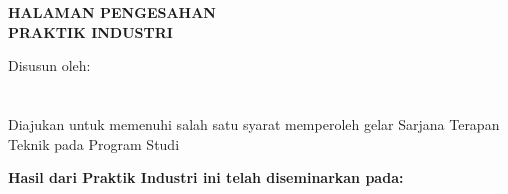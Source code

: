 \newpage


\begin{center}
    \begin{doublespace}
        \textbf{\large \MakeUppercase{HALAMAN PENGESAHAN\\ PRAKTIK INDUSTRI}}
    \end{doublespace}
\end{center}

\begin{center}
        \textbf{\normalsize \MakeUppercase {\judulid}}
\end{center}

\begin{center}
    Disusun oleh:\\
    \textbf{\penulis}\\
    \textbf{\nim}\\[0.5cm]

    Diajukan untuk memenuhi salah satu syarat memperoleh gelar Sarjana Terapan Teknik pada Program Studi {\prodi} {\departemen} {\fakultas} {\universitas}\\[1cm]
\end{center}

\begin{center}
    \textbf{Hasil dari Praktik Industri ini telah diseminarkan pada:}
\end{center}

